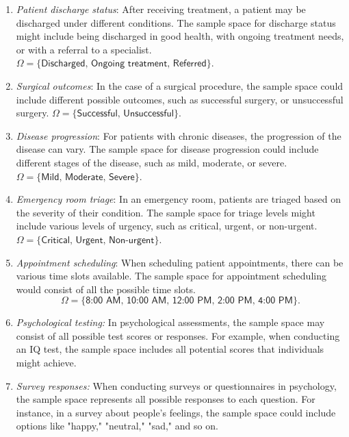 \documentclass{tufte-handout}
\begin{document}
\begin{enumerate}
\item \textit{Patient discharge status}: After receiving treatment, a patient may be discharged under different conditions. The sample space for discharge status might include being discharged in good health, with ongoing treatment needs, or with a referral to a specialist. $\Omega = \{\textsf{Discharged, Ongoing treatment, Referred}\}$.

\item \textit{Surgical outcomes}: In the case of a surgical procedure, the sample space could include different possible outcomes, such as successful surgery, or unsuccessful surgery. $\Omega = \{\textsf{Successful, Unsuccessful}\}$.


\item \textit{Disease progression}: For patients with chronic diseases, the progression of the disease can vary. The sample space for disease progression could include different stages of the disease, such as mild, moderate, or severe. $\Omega = \{\textsf{Mild, Moderate, Severe}\}$.

\item \textit{Emergency room triage}: In an emergency room, patients are triaged based on the severity of their condition. The sample space for triage levels might include various levels of urgency, such as critical, urgent, or non-urgent. $\Omega = \{\textsf{Critical, Urgent, Non-urgent}\}$.

\item \textit{Appointment scheduling}: When scheduling patient appointments, there can be various time slots available. The sample space for appointment scheduling would consist of all the possible time slots. $$\Omega = \{\textsf{8:00 AM, 10:00 AM, 12:00 PM, 2:00 PM, 4:00 PM}\}.$$

\item \textit{Psychological testing:} In psychological assessments, the sample space may consist of all possible test scores or responses. For example, when conducting an IQ test, the sample space includes all potential scores that individuals might achieve.

\item \textit{Survey responses:} When conducting surveys or questionnaires in psychology, the sample space represents all possible responses to each question. For instance, in a survey about people's feelings, the sample space could include options like "happy," "neutral," "sad," and so on.


\end{enumerate}
\end{document}

